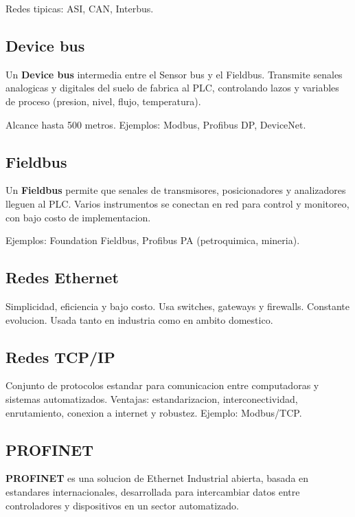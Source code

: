 Redes tipicas: ASI, CAN, Interbus.

\subsection{Device bus}

\begin{definicion}
Un \textbf{Device bus} intermedia entre el Sensor bus y el Fieldbus. Transmite senales analogicas y digitales del suelo de fabrica al PLC, controlando lazos y variables de proceso (presion, nivel, flujo, temperatura).
\end{definicion}

Alcance hasta 500 metros. Ejemplos: Modbus, Profibus DP, DeviceNet.

\subsection{Fieldbus}

\begin{definicion}
Un \textbf{Fieldbus} permite que senales de transmisores, posicionadores y analizadores lleguen al PLC. Varios instrumentos se conectan en red para control y monitoreo, con bajo costo de implementacion.
\end{definicion}

Ejemplos: Foundation Fieldbus, Profibus PA (petroquimica, mineria).

\subsection{Redes Ethernet}

Simplicidad, eficiencia y bajo costo. Usa switches, gateways y firewalls. Constante evolucion. Usada tanto en industria como en ambito domestico.

\subsection{Redes TCP/IP}

Conjunto de protocolos estandar para comunicacion entre computadoras y sistemas automatizados. Ventajas: estandarizacion, interconectividad, enrutamiento, conexion a internet y robustez. Ejemplo: Modbus/TCP.

\subsection{PROFINET}

\begin{definicion}
\textbf{PROFINET} es una solucion de Ethernet Industrial abierta, basada en estandares internacionales, desarrollada para intercambiar datos entre controladores y dispositivos en un sector automatizado.
\end{definicion}

